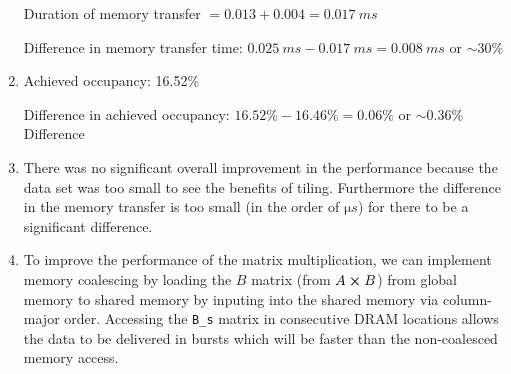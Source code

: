 \documentclass[../main.tex]{subfiles}
\begin{document}
\begin{enumerate}
    Duration of memory transfer $= 0.013 + 0.004 = \qty{0.017}{ms}$

    Difference in memory transfer time: $\qty{0.025}{ms} - \qty{0.017}{ms} = \qty{0.008}{ms}$ or
    $\sim 30\%$

    \item Achieved occupancy: 16.52\% 

    Difference in achieved occupancy: $16.52\% - 16.46\% = 0.06\%$ or $\sim 0.36\%$ Difference

    \item There was no significant overall improvement in the performance because the data set was
    too small to see the benefits of tiling. Furthermore the difference in the memory transfer 
    is too small (in the order of $\unit{\micro s}$) for there to be a significant difference.

    \item To improve the performance of the matrix multiplication, we can implement memory
    coalescing by loading the $B$ matrix (from $A \cross B$) from global memory to shared memory
    by inputing into the shared memory via column-major order. Accessing the \texttt{B\_s} matrix
    in consecutive DRAM locations allows the data to be delivered in bursts which will be
    faster than the non-coalesced memory access.
\end{enumerate}
\end{document}

